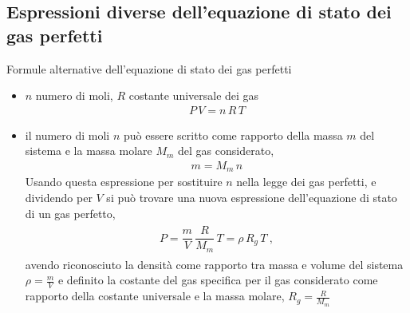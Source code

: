 \documentclass[letterpaper,10pt,italian]{jupyterBook}
\begin{document}
\sphinxstepscope


\subsection{Espressioni diverse dell’equazione di stato dei gas perfetti}
\label{\detokenize{ch/thermodynamics/ideal-gas-expressions:espressioni-diverse-dell-equazione-di-stato-dei-gas-perfetti}}\label{\detokenize{ch/thermodynamics/ideal-gas-expressions:physics-hs-thermodynamics-matter-gases-ideal-expressions}}\label{\detokenize{ch/thermodynamics/ideal-gas-expressions::doc}}
\sphinxAtStartPar
Formule alternative dell’equazione di stato dei gas perfetti
\begin{itemize}
\item {} 
\sphinxAtStartPar
\(n\) numero di moli, \(R\) costante universale dei gas
\begin{equation*}
\begin{split}P \, V = n \, R \, T\end{split}
\end{equation*}
\item {} 
\sphinxAtStartPar
il numero di moli \(n\) può essere scritto come rapporto della massa \(m\) del sistema e la massa molare \(M_m\) del gas considerato,
\begin{equation*}
\begin{split}m = M_m \, n\end{split}
\end{equation*}
\sphinxAtStartPar
Usando questa espressione per sostituire \(n\) nella legge dei gas perfetti, e dividendo per \(V\) si può trovare una nuova espressione dell’equazione di stato di un gas perfetto,
\begin{equation*}
\begin{split}\begin{aligned}
    P   = \dfrac{m}{V} \, \dfrac{R}{M_m} \, T     
        = \rho \, R_g \, T \ ,
  \end{aligned}\end{split}
\end{equation*}
\sphinxAtStartPar
avendo riconosciuto la densità come rapporto tra massa e volume del sistema \(\rho = \frac{m}{V}\) e definito la costante    del gas specifica per il gas considerato come rapporto della costante universale e la massa molare, \(R_g = \frac{R}{M_m}\)


\end{itemize}
\end{document}
